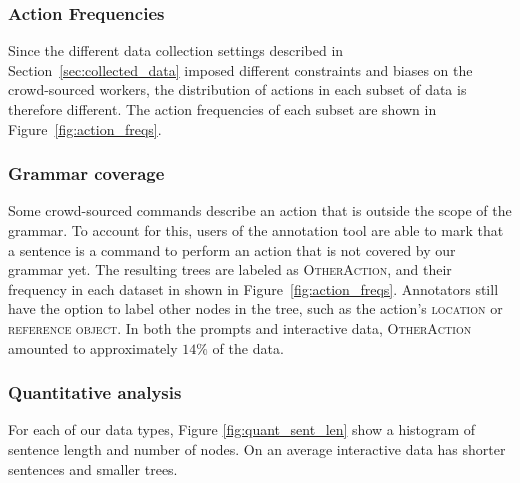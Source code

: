 \subsubsection{Action Frequencies}
Since the different data collection settings described in Section~\ref{sec:collected_data} imposed different constraints and biases on the crowd-sourced workers, the distribution of actions in each subset of data is therefore different. 
The action frequencies of each subset are shown in Figure~\ref{fig:action_freqs}.


\subsubsection{Grammar coverage} 
Some crowd-sourced commands describe an action that is outside the scope of the grammar. To account for this, users of the annotation tool are able to mark that a sentence is a command to perform an action that is not covered by our grammar yet. The resulting trees are labeled as \textsc{OtherAction}, and their frequency in each dataset in shown in Figure~\ref{fig:action_freqs}. Annotators still have the option to label other nodes in the tree, such as the action's \textsc{location} or \textsc{reference object}.  In both the prompts and interactive data, \textsc{OtherAction} amounted to approximately $14\%$ of the data.


\subsubsection{Quantitative analysis} 
\label{sec:quant_analysis}
For each of our data types, Figure \ref{fig:quant_sent_len}  show a histogram of sentence length and number of nodes.   On an average interactive data has shorter sentences and smaller trees.

